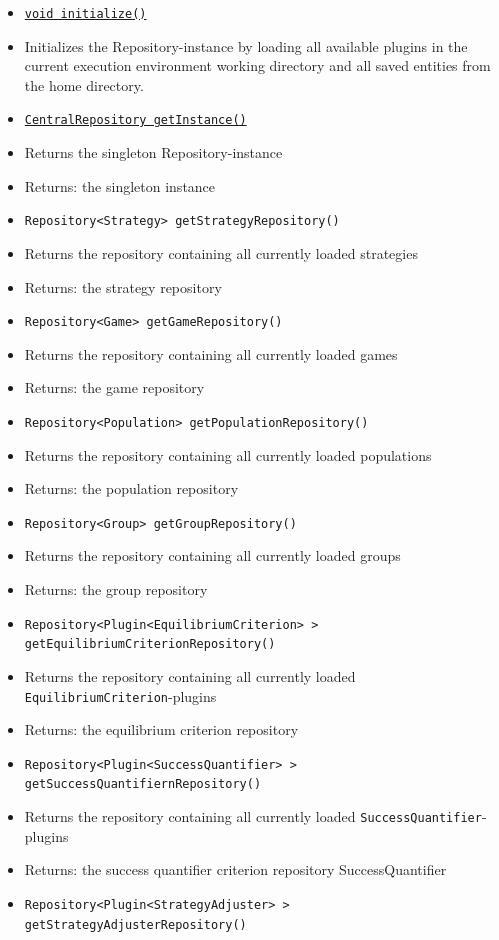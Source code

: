 \documentclass[parskip=full,11pt]{scrartcl}
\begin{document}
\begin{itemize} \itemsep -10pt
	\item \underline{\texttt{void initialize()}}
	\item[] Initializes the Repository-instance by loading all available plugins in the current execution environment working directory and all saved entities from the home directory.
	\item \underline{\texttt{CentralRepository getInstance()}}
	\item[]Returns the singleton Repository-instance
	\item[] Returns: the singleton instance
	\item \texttt{Repository<Strategy> getStrategyRepository()}
	\item[]Returns the repository containing all currently loaded strategies
	\item[] Returns: the strategy repository
	\item \texttt{Repository<Game> getGameRepository()}
	\item[]Returns the repository containing all currently loaded games
	\item[] Returns: the game repository
	\item \texttt{Repository<Population> getPopulationRepository()}
	\item[]Returns the repository containing all currently loaded populations
	\item[] Returns: the population repository
	\item \texttt{Repository<Group> getGroupRepository()}
	\item[]Returns the repository containing all currently loaded groups
	\item[] Returns: the group repository
	\item \texttt{Repository<Plugin<EquilibriumCriterion>\,> getEquilibriumCriterionRepository()}
	\item[]Returns the repository containing all currently loaded \texttt{EquilibriumCriterion}-plugins
	\item[] Returns: the equilibrium criterion repository
	\item\texttt{Repository<Plugin<SuccessQuantifier>\,> getSuccessQuantifiernRepository()}
	\item[]Returns the repository containing all currently loaded \texttt{SuccessQuantifier}-plugins
	\item[] Returns: the success quantifier criterion repository
	SuccessQuantifier
	\item\texttt{Repository<Plugin<StrategyAdjuster>\,> getStrategyAdjusterRepository()}

\end{itemize}
\end{document}
